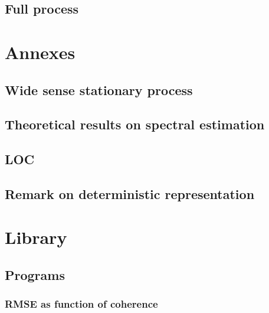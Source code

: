\documentclass[a4paper, 12pt]{report}
\begin{document}
\chapter{Full process}
\label{chap:fullprocess}


\part{Annexes}
\chapter{Wide sense stationary process}
\label{ann:wss}

\chapter{Theoretical results on spectral estimation}
\label{ann:spectral-estimation}
 
\chapter{LOC}
 
\chapter{Remark on deterministic representation}
 

\part{Library}
 \def\programsfullprocess{fullprocess/}
 \def\programsToolbox{fullprocess/ZZtoolbox/}
 \def\programspierrick{fullprocess/ZZtoolbox/00Pierrick/}
\chapter{Programs}
 \section{RMSE as function of coherence}
{\tiny }
\end{document}
